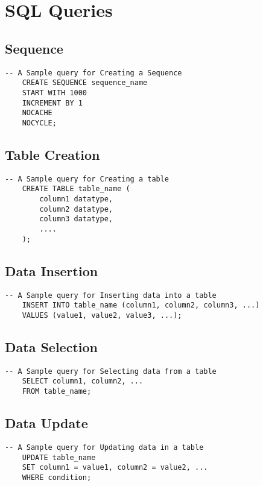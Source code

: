 \chapter{SQL Queries}
\hrulefill

\section{Sequence}
\begin{lstlisting}[caption={Sample Sequence}, label={lst:s1}]
    -- A Sample query for Creating a Sequence
    CREATE SEQUENCE sequence_name
    START WITH 1000
    INCREMENT BY 1
    NOCACHE
    NOCYCLE;

    \end{lstlisting}

\section{Table Creation}
\begin{lstlisting}[caption={Sample one Table}, label={lst:c1}]
    -- A Sample query for Creating a table
    CREATE TABLE table_name (
        column1 datatype,
        column2 datatype,
        column3 datatype,
        ....
    );
    \end{lstlisting}

\section{Data Insertion}
\begin{lstlisting}[caption={Sample one Table}, label={lst:i1}]
    -- A Sample query for Inserting data into a table
    INSERT INTO table_name (column1, column2, column3, ...)
    VALUES (value1, value2, value3, ...);
    \end{lstlisting}

\section{Data Selection}
\begin{lstlisting}[caption={Sample one Table}, label={lst:s1}]
    -- A Sample query for Selecting data from a table
    SELECT column1, column2, ...
    FROM table_name;
    \end{lstlisting}

\section{Data Update}
\begin{lstlisting}[caption={Sample one Table}, label={lst:u1}]
    -- A Sample query for Updating data in a table
    UPDATE table_name
    SET column1 = value1, column2 = value2, ...
    WHERE condition;
    \end{lstlisting}


